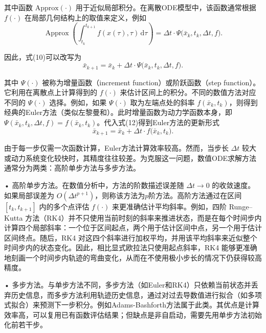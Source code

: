 \documentclass[UTF8,a4paper,zihao=-4,oneside,openany]{ctexbook}
\begin{document}
其中函数 $\mathrm{Approx}(\cdot)$ 用于近似局部积分。在离散ODE模型中，该函数通常根据 $f(\cdot)$ 在局部几何结构上的取值来定义，例如
\begin{equation}
\operatorname{Approx}
\left(
\int_{t_k}^{t_{k+1}}
f(x(\tau),\tau)\,\mathrm{d}\tau
\right)
=
\Delta t \cdot
\Psi\bigl(\bar{x}_k,t_k,\Delta t,f\bigr).
\label{eq:approx-integral-psi}
\end{equation}

因此，式(10)可以改写为
\begin{equation}
\bar{x}_{k+1}
=
\bar{x}_k
+
\Delta t \cdot
\Psi\bigl(\bar{x}_k,t_k,\Delta t,f\bigr).
\label{eq:general-ode-solver-update}
\end{equation}

其中 $\Psi(\cdot)$ 被称为增量函数（increment function）或阶跃函数（step function）。它利用在离散点上计算得到的 $f(\cdot)$ 来估计区间上的积分。不同的数值方法对应不同的 $\Psi(\cdot)$ 选择。例如，如果 $\Psi(\cdot)$ 取为左端点处的斜率 $f(\bar{x}_k,t_k)$，则得到经典的Euler方法（类似左黎曼和）。此时增量函数为动力学函数本身，即 $\Psi(\bar{x}_k,t_k,\Delta t,f)=f(\bar{x}_k,t_k)$。代入式(12)得到Euler方法的更新形式
\begin{equation}
\bar{x}_{k+1}
=
\bar{x}_k
+
\Delta t \cdot
f\bigl(\bar{x}_k,t_k\bigr).
\label{eq:euler-method-update}
\end{equation}

由于每一步仅需一次函数计算，Euler方法计算效率较高。然而，当步长 $\Delta t$ 较大或动力系统变化较快时，其精度往往较差。为克服这一问题，数值ODE求解方法通常分为两类：高阶单步方法与多步方法。

• 高阶单步方法。在数值分析中，方法的阶数描述误差随 $\Delta t\to 0$ 的收敛速度。如果局部误差为 $O(\Delta t^{p+1})$，则称该方法为$p$阶方法。高阶方法通过在区间 $[t_k,t_{k+1}]$ 内的多个点评估 $f(\cdot)$ 来更准确估计平均斜率。例如，四阶 Runge--Kutta 方法（RK4）并不只使用当前时刻的斜率来推进状态，而是在每个时间步内计算四个局部斜率：一个位于区间起点，两个用于估计区间中点，另一个用于估计区间终点。随后，RK4 对这四个斜率进行加权平均，并用该平均斜率来近似整个时间步内的状态变化。因此，相比显式欧拉法只使用起点斜率，RK4 能够更准确地刻画一个时间步内轨迹的弯曲变化，从而在不使用极小步长的情况下仍获得较高精度。

• 多步方法。与单步方法不同，多步方法（如Euler和RK4）只依赖当前状态并丢弃历史信息，而多步方法利用轨迹历史信息，通过对过去导数值进行拟合（如多项式拟合）来预测下一步积分。例如Adams-Bashforth方法属于此类。其优点是计算效率高，可以复用已有函数评估结果；但缺点是非自启动，需要先用单步方法初始化前若干步。
\end{document}
